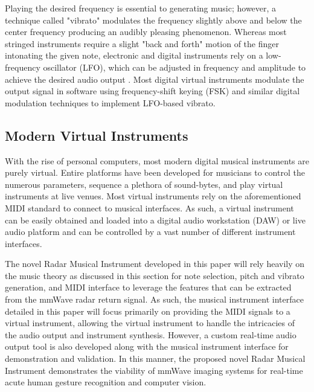 \documentclass[10pt,journal,final]{IEEEtran}
\begin{document}
Playing the desired frequency is essential to generating music; however, a technique called "vibrato" modulates the frequency slightly above and below the center frequency producing an audibly pleasing phenomenon. Whereas most stringed instruments require a slight "back and forth" motion of the finger intonating the given note, electronic and digital instruments rely on a low-frequency oscillator (LFO), which can be adjusted in frequency and amplitude to achieve the desired audio output \cite{music:LFO1}. Most digital virtual instruments modulate the output signal in software using frequency-shift keying (FSK) and similar digital modulation techniques to implement LFO-based vibrato.

\subsection{Modern Virtual Instruments}
\label{subsec:modern_virtual_instruments}
With the rise of personal computers, most modern digital musical instruments are purely virtual. Entire platforms have been developed for musicians to control the numerous parameters, sequence a plethora of sound-bytes, and play virtual instruments at live venues. Most virtual instruments rely on the aforementioned MIDI standard to connect to musical interfaces. As such, a virtual instrument can be easily obtained and loaded into a digital audio workstation (DAW) or live audio platform and can be controlled by a vast number of different instrument interfaces. 

The novel Radar Musical Instrument developed in this paper will rely heavily on the music theory as discussed in this section for note selection, pitch and vibrato generation, and MIDI interface to leverage the features that can be extracted from the mmWave radar return signal. As such, the musical instrument interface detailed in this paper will focus primarily on providing the MIDI signals to a virtual instrument, allowing the virtual instrument to handle the intricacies of the audio output and instrument synthesis. However, a custom real-time audio output tool is also developed along with the musical instrument interface for demonstration and validation. In this manner, the proposed novel Radar Musical Instrument demonstrates the viability of mmWave imaging systems for real-time acute human gesture recognition and computer vision.
\end{document}
